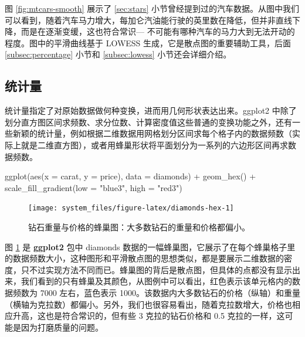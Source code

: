 \documentclass[
  b5paper,
  UTF8,twoside]{book}
\newenvironment{Shaded}{\begin{snugshade}}{\end{snugshade}}
\newcommand{\AttributeTok}[1]{\textcolor[rgb]{0.77,0.63,0.00}{#1}}
\newcommand{\FunctionTok}[1]{\textcolor[rgb]{0.00,0.00,0.00}{#1}}
\newcommand{\NormalTok}[1]{#1}
\newcommand{\SpecialCharTok}[1]{\textcolor[rgb]{0.00,0.00,0.00}{#1}}
\newcommand{\StringTok}[1]{\textcolor[rgb]{0.31,0.60,0.02}{#1}}
\begin{document}
图 \ref{fig:mtcars-smooth} 展示了 \ref{sec:stars} 小节曾经提到过的汽车数据。从图中我们可以看到，随着汽车马力增大，每加仑汽油能行驶的英里数在降低，但并非直线下降，而是在逐渐变缓，这也符合常识--- 不可能有哪种汽车的马力大到无法开动的程度。图中的平滑曲线基于 LOWESS 生成，它是散点图的重要辅助工具，后面 \ref{subsec:percentage} 小节和 \ref{subsec:lowess} 小节还会详细介绍。

\hypertarget{ux7edfux8ba1ux91cf}{%
\subsection{统计量}\label{ux7edfux8ba1ux91cf}}

统计量指定了对原始数据做何种变换，进而用几何形状表达出来。ggplot2 中除了划分直方图区间求频数、求分位数、计算密度值这些普通的变换功能之外，还有一些新颖的统计量，例如根据二维数据用网格划分区间求每个格子内的数据频数（实际上就是二维直方图），或者用蜂巢形状将平面划分为一系列的六边形区间再求数据频数。

\begin{Shaded}
\begin{Highlighting}[]
\FunctionTok{ggplot}\NormalTok{(}\FunctionTok{aes}\NormalTok{(}\AttributeTok{x =}\NormalTok{ carat, }\AttributeTok{y =}\NormalTok{ price), }\AttributeTok{data =}\NormalTok{ diamonds) }\SpecialCharTok{+}
  \FunctionTok{geom\_hex}\NormalTok{() }\SpecialCharTok{+}
  \FunctionTok{scale\_fill\_gradient}\NormalTok{(}\AttributeTok{low =} \StringTok{"blue3"}\NormalTok{, }\AttributeTok{high =} \StringTok{"red3"}\NormalTok{)}
\end{Highlighting}
\end{Shaded}

\begin{figure}

{\centering \texttt{[image: system\_files/figure-latex/diamonds-hex-1]} 

}

\caption[钻石重量与价格的蜂巢图]{钻石重量与价格的蜂巢图：大多数钻石的重量和价格都偏小。}\label{fig:diamonds-hex}
\end{figure}





图 \ref{fig:diamonds-hex} 是 \textbf{ggplot2} 包中 diamonds 数据的一幅蜂巢图，它展示了在每个蜂巢格子里的数据频数大小，这种图形和平滑散点图的思想类似，都是要展示二维数据的密度，只不过实现方法不同而已。蜂巢图的背后是散点图，但具体的点都没有显示出来，我们看到的只有蜂巢及其颜色，从图例中可以看出，红色表示该单元格内的数据频数为 7000 左右，蓝色表示 1000。该数据内大多数钻石的价格（纵轴）和重量（横轴为克拉数）都偏小。另外，我们也很容易看出，随着克拉数增大，价格也相应升高，这也是符合常识的，但有些 3 克拉的钻石价格和 0.5 克拉的一样，这可能是因为打磨质量的问题。
\end{document}
